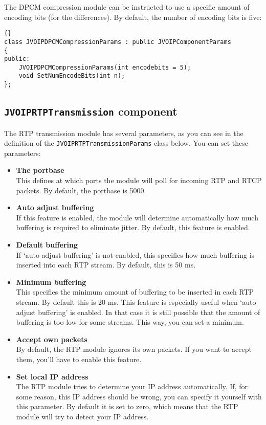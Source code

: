 		The DPCM compression module can be instructed to use a specific amount
		of encoding bits (for the differences). By default, the number of
		encoding bits is five:
		
		\begin{lstlisting}[frame=tb]{}
class JVOIPDPCMCompressionParams : public JVOIPComponentParams
{
public:
	JVOIPDPCMCompressionParams(int encodebits = 5);
	void SetNumEncodeBits(int n);
};
		\end{lstlisting}
		
		\subsection{{\tt JVOIPRTPTransmission} component}
		
		The RTP transmission module has several parameters, as you can see
		in the definition of the {\tt JVOIPRTPTransmissionParams} class below.
		You can set these parameters:
		\begin{itemize}
			\item {\bf The portbase}\\
			      This defines at which ports the module will poll for
			      incoming RTP and RTCP packets. By default, the portbase
			      is 5000.
			\item {\bf Auto adjust buffering}\\
			      If this feature is enabled, the module will determine
			      automatically how much buffering is required to eliminate
			      jitter. By default, this feature is enabled.
			\item {\bf Default buffering}\\
			      If `auto adjust buffering' is not enabled, this specifies
			      how much buffering is inserted into each RTP stream. By
			      default, this is 50 ms.
			\item {\bf Minimum buffering}\\
			      This specifies the minimum amount of buffering to be inserted
			      in each RTP stream. By default this is 20 ms. This feature is
			      especially useful when `auto adjust buffering' is enabled. In 
			      that case it is still possible that the amount of buffering is
			      too low for some streams. This way, you can set a minimum.
			\item {\bf Accept own packets}\\
			      By default, the RTP module ignores its own packets. If you
			      want to accept them, you'll have to enable this feature.
			\item {\bf Set local IP address}\\
			      The RTP module tries to determine your IP address automatically.
			      If, for some reason, this IP address should be wrong, you can
			      specify it yourself with this parameter. By default it is set to
			      zero, which means that the RTP module will try to detect your IP
			      address.
		\end{itemize}
		

